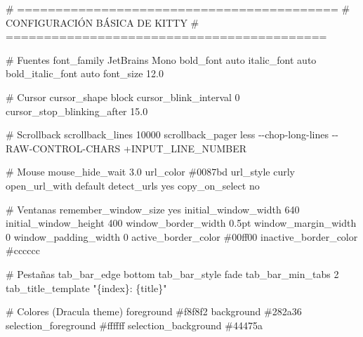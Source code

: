 \documentclass[
  doc,
  floatsintext,
  longtable,
  a4paper,
  nolmodern,
  notxfonts,
  notimes,
  12pt,
  colorlinks=true,linkcolor=blue,citecolor=blue,urlcolor=blue]{apa7}
\newenvironment{Shaded}{\begin{snugshade}}{\end{snugshade}}
\newcommand{\CommentTok}[1]{\textcolor[rgb]{0.37,0.37,0.37}{#1}}
\newcommand{\DataTypeTok}[1]{\textcolor[rgb]{0.68,0.00,0.00}{#1}}
\newcommand{\ErrorTok}[1]{\textcolor[rgb]{0.68,0.00,0.00}{#1}}
\begin{document}
\begin{Shaded}
\begin{Highlighting}[]
\CommentTok{\# ==========================================}
\CommentTok{\# CONFIGURACIÓN BÁSICA DE KITTY}
\CommentTok{\# ==========================================}

\CommentTok{\# Fuentes}
\DataTypeTok{font\_family}      \DataTypeTok{JetBrains} \DataTypeTok{Mono}
\DataTypeTok{bold\_font}        \DataTypeTok{auto}
\DataTypeTok{italic\_font}      \DataTypeTok{auto}
\DataTypeTok{bold\_italic\_font} \DataTypeTok{auto}
\DataTypeTok{font\_size}        \DataTypeTok{12.0}

\CommentTok{\# Cursor}
\DataTypeTok{cursor\_shape} \DataTypeTok{block}
\DataTypeTok{cursor\_blink\_interval} \DataTypeTok{0}
\DataTypeTok{cursor\_stop\_blinking\_after} \DataTypeTok{15.0}

\CommentTok{\# Scrollback}
\DataTypeTok{scrollback\_lines} \DataTypeTok{10000}
\DataTypeTok{scrollback\_pager} \DataTypeTok{less} \DataTypeTok{{-}{-}chop{-}long{-}lines} \DataTypeTok{{-}{-}RAW{-}CONTROL{-}CHARS} \ErrorTok{+}\DataTypeTok{INPUT\_LINE\_NUMBER}

\CommentTok{\# Mouse}
\DataTypeTok{mouse\_hide\_wait} \DataTypeTok{3.0}
\DataTypeTok{url\_color} \CommentTok{\#0087bd}
\DataTypeTok{url\_style} \DataTypeTok{curly}
\DataTypeTok{open\_url\_with} \DataTypeTok{default}
\DataTypeTok{detect\_urls} \DataTypeTok{yes}
\DataTypeTok{copy\_on\_select} \DataTypeTok{no}

\CommentTok{\# Ventanas}
\DataTypeTok{remember\_window\_size}  \DataTypeTok{yes}
\DataTypeTok{initial\_window\_width}  \DataTypeTok{640}
\DataTypeTok{initial\_window\_height} \DataTypeTok{400}
\DataTypeTok{window\_border\_width} \DataTypeTok{0.5pt}
\DataTypeTok{window\_margin\_width} \DataTypeTok{0}
\DataTypeTok{window\_padding\_width} \DataTypeTok{0}
\DataTypeTok{active\_border\_color} \CommentTok{\#00ff00}
\DataTypeTok{inactive\_border\_color} \CommentTok{\#cccccc}

\CommentTok{\# Pestañas}
\DataTypeTok{tab\_bar\_edge} \DataTypeTok{bottom}
\DataTypeTok{tab\_bar\_style} \DataTypeTok{fade}
\DataTypeTok{tab\_bar\_min\_tabs} \DataTypeTok{2}
\DataTypeTok{tab\_title\_template} \DataTypeTok{"\{index\}: \{title\}"}

\CommentTok{\# Colores (Dracula theme)}
\DataTypeTok{foreground} \CommentTok{\#f8f8f2}
\DataTypeTok{background} \CommentTok{\#282a36}
\DataTypeTok{selection\_foreground} \CommentTok{\#ffffff}
\DataTypeTok{selection\_background} \CommentTok{\#44475a}


\end{Highlighting}
\end{Shaded}
\end{document}
